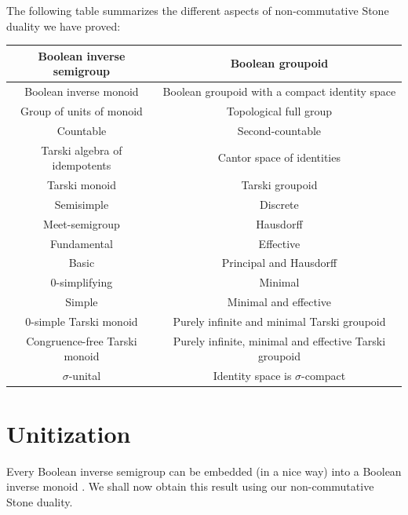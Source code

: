 \documentclass[a4paper]{amsart}
\begin{document}
The following table summarizes the different aspects of non-commutative Stone duality we have proved:

\vspace{0.5cm}
\begin{center}
\begin{tabular}{|c||c|}\hline
{\bf Boolean inverse semigroup} & {\bf Boolean groupoid}  \\ \hline \hline
{\small Boolean inverse monoid} & {\small Boolean groupoid with a compact identity space} \\ \hline
{\small Group of units of monoid} & {\small Topological full group} \\ \hline
{\small Countable} & {\small Second-countable}  \\ \hline 
{\small Tarski algebra of idempotents} & {\small Cantor space of identities} \\ \hline
{\small Tarski monoid} & {\small Tarski groupoid} \\ \hline
{\small Semisimple} & {\small Discrete} \\ \hline
{\small Meet-semigroup} & {\small Hausdorff} \\ \hline
{\small Fundamental} & {\small Effective}  \\ \hline
{\small Basic} & {\small Principal and Hausdorff} \\ \hline
{\small $0$-simplifying} & {\small Minimal} \\ \hline
{\small Simple} & {\small Minimal and effective} \\ \hline
{\small $0$-simple Tarski monoid} & {\small Purely infinite and minimal Tarski groupoid} \\ \hline
{\small Congruence-free Tarski monoid} & {\small Purely infinite, minimal and effective Tarski groupoid} \\ \hline
{\small $\sigma$-unital} & {\small Identity space is $\sigma$-compact} \\ \hline
\end{tabular}
\end{center}
\vspace{0.5cm}


\section{Unitization}

Every Boolean inverse semigroup can be embedded (in a nice way) into a Boolean inverse monoid \cite[Definition 6.6.1]{W}.
We shall now obtain this result using our non-commutative Stone duality.
\end{document}
